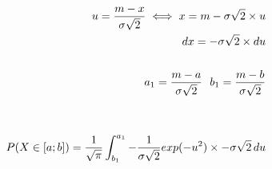 \documentclass[preview]{standalone}
\begin{document}
\begin{align*}
u = {{m - x} \over {\sigma \sqrt{2}} } \iff x = m - \sigma \sqrt{2} \times u \\ dx = - \sigma \sqrt{2} \times du \\ \\ a_1 = {{m - a} \over {\sigma \sqrt{2}} } \, \, \, \,b_1 = {{m - b} \over {\sigma \sqrt{2}} } \\ \\ \\ P( X \in [a;b] ) = { \frac{1}{\sqrt{\pi}} } \int_{b_1}^{a_1} { { - \frac{1}{\sigma \sqrt{2}} } exp( -u^2 ) \times - \sigma \sqrt{2} } \, du
\end{align*}
\end{document}
